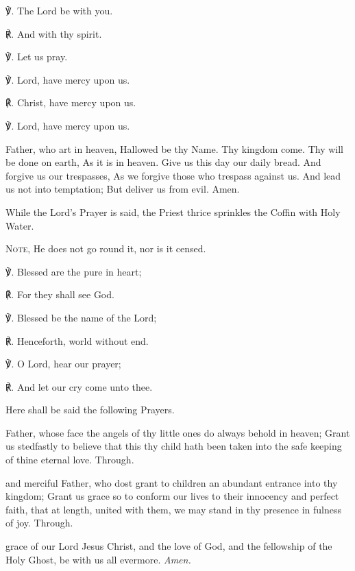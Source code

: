 ℣. The Lord be with you.

℟. And with thy spirit.

℣. Let us pray.

℣. Lord, have mercy upon us.

℟. Christ, have mercy upon us.

℣. Lord, have mercy upon us.

\clearpage
{} Father, who art in heaven, Hallowed be thy Name. Thy kingdom come. Thy will be done on earth, As it is in heaven. Give us this day our daily bread. And forgive us our trespasses, As we forgive those who trespass against us. And lead us not into temptation; But deliver us from evil. Amen.

\begin{rubric}
    While the Lord's Prayer is said, the Priest thrice sprinkles the Coffin with Holy Water.\par
    \textsc{Note,} He does not go round it, nor is it censed.
\end{rubric}\par
℣. Blessed are the pure in heart;\par
℟. For they shall see God.\par
℣. Blessed be the name of the Lord;\par
℟. Henceforth, world without end.\par
℣. O Lord, hear our prayer;\par
℟. And let our cry come unto thee.\par
\begin{rubric}
    Here shall be said the following Prayers.
\end{rubric}\par

 Father, whose face the angels of thy little ones do always behold in heaven; Grant us stedfastly to believe that this thy child hath been taken into the safe keeping of thine eternal love. Through.\par

 and merciful Father, who dost grant to children an abundant entrance into thy kingdom; Grant us grace so to conform our lives to their innocency and perfect faith, that at length, united with them, we may stand in thy presence in fulness of joy. Through.\par

 grace of our Lord Jesus {} Christ, and the love of God, and the fellowship of the Holy Ghost, be with us all evermore. \textit{Amen.}\\

